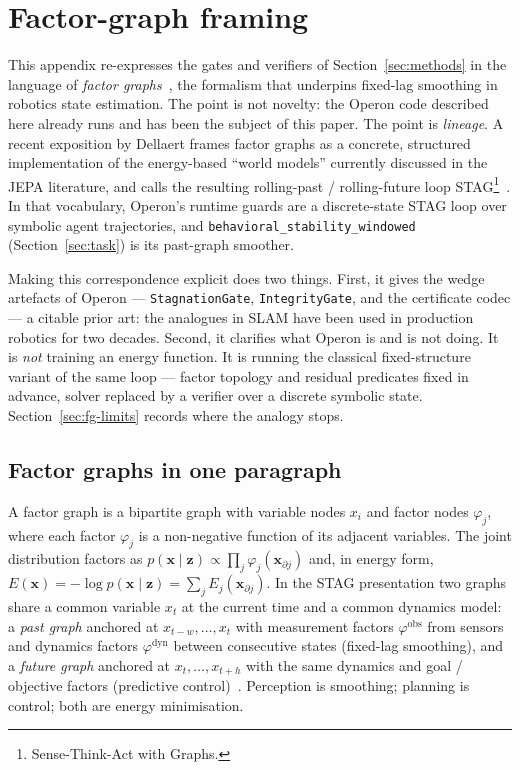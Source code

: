 \appendix
\section{Factor-graph framing}\label{sec:factor-graphs}

This appendix re-expresses the gates and verifiers of
Section~\ref{sec:methods} in the language of \emph{factor
graphs}~\cite{dellaert2017factor}, the formalism that underpins
fixed-lag smoothing in robotics state estimation.  The point is not
novelty: the Operon code described here already runs and has been the
subject of this paper.  The point is \emph{lineage}.  A recent
exposition by Dellaert frames factor graphs as a concrete, structured
implementation of the energy-based ``world models'' currently
discussed in the JEPA literature, and calls the resulting rolling-past
/ rolling-future loop STAG\footnote{Sense-Think-Act with Graphs.}~\cite{dellaert2026stag}.
In that vocabulary, Operon's runtime guards are a discrete-state STAG
loop over symbolic agent trajectories, and \texttt{behavioral\_stability\_windowed}
(Section~\ref{sec:task}) is its past-graph smoother.

Making this correspondence explicit does two things.  First, it gives
the wedge artefacts of Operon --- \texttt{StagnationGate},
\texttt{IntegrityGate}, and the certificate codec --- a citable prior
art: the analogues in SLAM have been used in production robotics for
two decades.  Second, it clarifies what Operon is and is not doing.
It is \emph{not} training an energy function.  It is running the
classical fixed-structure variant of the same loop --- factor topology
and residual predicates fixed in advance, solver replaced by a
verifier over a discrete symbolic state.  Section~\ref{sec:fg-limits}
records where the analogy stops.

\subsection{Factor graphs in one paragraph}\label{sec:fg-recap}

A factor graph is a bipartite graph with variable nodes $x_i$ and
factor nodes $\varphi_j$, where each factor $\varphi_j$ is a
non-negative function of its adjacent variables.  The joint
distribution factors as $p(\mathbf{x} \mid \mathbf{z}) \propto
\prod_j \varphi_j(\mathbf{x}_{\partial j})$ and, in energy form,
$E(\mathbf{x}) = -\log p(\mathbf{x} \mid \mathbf{z}) =
\sum_j E_j(\mathbf{x}_{\partial j})$.  In the STAG presentation two
graphs share a common variable $x_t$ at the current time and a
common dynamics model: a \emph{past graph} anchored at $x_{t-w},
\ldots, x_t$ with measurement factors $\varphi^{\text{obs}}$ from
sensors and dynamics factors $\varphi^{\text{dyn}}$ between
consecutive states (fixed-lag smoothing), and a \emph{future graph}
anchored at $x_t, \ldots, x_{t+h}$ with the same dynamics and
goal / objective factors (predictive control)~\cite{dellaert2026stag}.
Perception is smoothing; planning is control; both are energy
minimisation.

